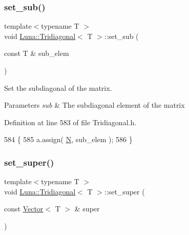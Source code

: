 \subsubsection{\texorpdfstring{set\+\_\+sub()}{set\_sub()}\hspace{0.1cm}{\footnotesize\ttfamily [2/2]}}
{\footnotesize\ttfamily template$<$typename T $>$ \\
void \hyperlink{classLuna_1_1Tridiagonal}{Luna\+::\+Tridiagonal}$<$ T $>$\+::set\+\_\+sub (\begin{DoxyParamCaption}\item[{const T \&}]{sub\+\_\+elem }\end{DoxyParamCaption})\hspace{0.3cm}{\ttfamily [inline]}}



Set the subdiagonal of the matrix. 


\begin{DoxyParams}{Parameters}
{\em sub} & The subdiagonal element of the matrix \\
\hline
\end{DoxyParams}


Definition at line 583 of file Tridiagonal.\+h.


\begin{DoxyCode}
584   \{
585     a.assign( \hyperlink{namespaceHeat__plot_a7d050092798e28458a263710837bda77}{N}, sub\_elem );
586   \}
\end{DoxyCode}
\mbox{\label{classLuna_1_1Tridiagonal_a875d22427ef3a88accb530fe9806bfa4}} 
\subsubsection{\texorpdfstring{set\+\_\+super()}{set\_super()}\hspace{0.1cm}{\footnotesize\ttfamily [1/2]}}
{\footnotesize\ttfamily template$<$typename T $>$ \\
void \hyperlink{classLuna_1_1Tridiagonal}{Luna\+::\+Tridiagonal}$<$ T $>$\+::set\+\_\+super (\begin{DoxyParamCaption}\item[{const \hyperlink{classLuna_1_1Vector}{Vector}$<$ T $>$ \&}]{super }\end{DoxyParamCaption})\hspace{0.3cm}{\ttfamily [inline]}}



